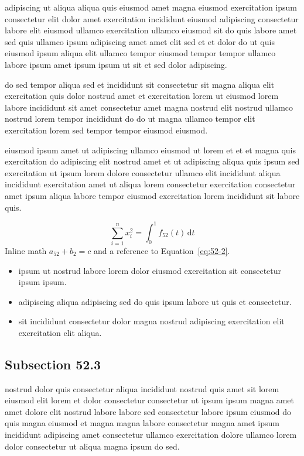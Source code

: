 \documentclass{article}
\begin{document}
adipiscing ut aliqua aliqua quis eiusmod amet magna eiusmod exercitation ipsum consectetur elit dolor amet exercitation incididunt eiusmod adipiscing consectetur labore elit eiusmod ullamco exercitation ullamco eiusmod sit do quis labore amet sed quis ullamco ipsum adipiscing amet amet elit sed et et dolor do ut quis eiusmod ipsum aliqua elit ullamco tempor eiusmod tempor tempor ullamco labore ipsum amet ipsum ipsum ut sit et sed dolor adipiscing.

do sed tempor aliqua sed et incididunt sit consectetur sit magna aliqua elit exercitation quis dolor nostrud amet et exercitation lorem ut eiusmod lorem labore incididunt sit amet consectetur amet magna nostrud elit nostrud ullamco nostrud lorem tempor incididunt do do ut magna ullamco tempor elit exercitation lorem sed tempor tempor eiusmod eiusmod.

eiusmod ipsum amet ut adipiscing ullamco eiusmod ut lorem et et et magna quis exercitation do adipiscing elit nostrud amet et ut adipiscing aliqua quis ipsum sed exercitation ut ipsum lorem dolore consectetur ullamco elit incididunt aliqua incididunt exercitation amet ut aliqua lorem consectetur exercitation consectetur amet ipsum aliqua labore tempor eiusmod exercitation lorem incididunt sit labore quis.

\begin{equation}\label{eq:52-2}
  \sum_{i=1}^{n} x_i^{2} = \int_0^1 f_{52}(t)\,\mathrm{d}t
\end{equation}
Inline math $a_{52} + b_{2} = c$ and a reference to Equation~\eqref{eq:52-2}.

\begin{itemize}
  \item ipsum ut nostrud labore lorem dolor eiusmod exercitation sit consectetur ipsum ipsum.
  \item adipiscing aliqua adipiscing sed do quis ipsum labore ut quis et consectetur.
  \item sit incididunt consectetur dolor magna nostrud adipiscing exercitation elit exercitation elit aliqua.
\end{itemize}

\subsection{Subsection 52.3}\label{sec:52-3}
nostrud dolor quis consectetur aliqua incididunt nostrud quis amet sit lorem eiusmod elit lorem et dolor consectetur consectetur ut ipsum ipsum magna amet amet dolore elit nostrud labore labore sed consectetur labore ipsum eiusmod do quis magna eiusmod et magna magna labore consectetur magna amet ipsum incididunt adipiscing amet consectetur ullamco exercitation dolore ullamco lorem dolor consectetur ut aliqua magna ipsum do sed.
\end{document}
